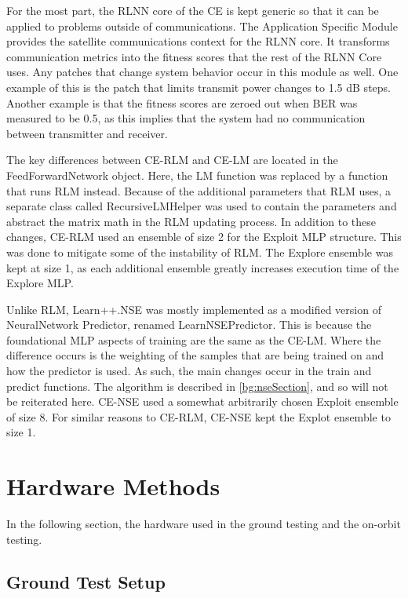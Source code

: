 \par For the most part, the RLNN core of the CE is kept generic so that it can be applied to problems outside of communications. The Application Specific Module provides the satellite communications context for the RLNN core. It transforms communication metrics into the fitness scores that the rest of the RLNN Core uses. Any patches that change system behavior occur in this module as well. One example of this is the patch that limits transmit power changes to 1.5 dB steps. Another example is that the fitness scores are zeroed out when BER was measured to be 0.5, as this implies that the system had no communication between transmitter and receiver. 
\par The key differences between CE-RLM and CE-LM are located in the FeedForwardNetwork object. Here, the LM function was replaced by a function that runs RLM instead. Because of the additional parameters that RLM uses, a separate class called RecursiveLMHelper was used to contain the parameters and abstract the matrix math in the RLM updating process. In addition to these changes, CE-RLM used an ensemble of size 2 for the Exploit MLP structure. This was done to mitigate some of the instability of RLM. The Explore ensemble was kept at size 1, as each additional ensemble greatly increases execution time of the Explore MLP.
\par Unlike RLM, Learn++.NSE was mostly implemented as a modified version of NeuralNetwork Predictor, renamed LearnNSEPredictor. This is because the foundational MLP aspects of training are the same as the CE-LM. Where the difference occurs is the weighting of the samples that are being trained on and how the predictor is used. As such, the main changes occur in the train and predict functions. The algorithm is described in \ref{bg:nseSection}, and so will not be reiterated here. CE-NSE used a somewhat arbitrarily chosen Exploit ensemble of size 8. For similar reasons to CE-RLM, CE-NSE kept the Explot ensemble to size 1.
\section{Hardware Methods}\label{methods:hardware}
\par In the following section, the hardware used in the ground testing and the on-orbit testing.
\subsection{Ground Test Setup}

